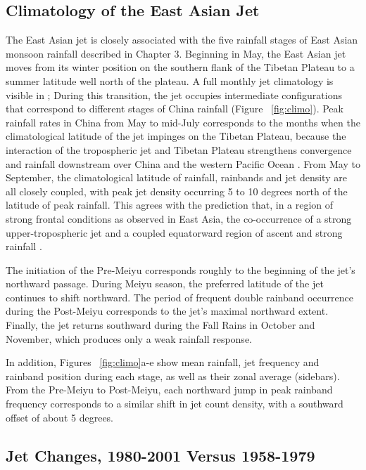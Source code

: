 \subsection{Climatology of the East Asian Jet}

	The East Asian jet is closely associated with the five rainfall stages of East Asian monsoon rainfall described in Chapter 3. Beginning in May, the East Asian jet moves from its winter position on the southern flank of the Tibetan Plateau to a summer latitude well north of the plateau.  A full monthly jet climatology is visible in \citet{Schiemann2009}; During this transition, the jet occupies intermediate configurations that correspond to different stages of China rainfall (Figure ~\ref{fig:climo}). Peak rainfall rates in China from May to mid-July corresponds to the months when the climatological latitude of the jet impinges on the Tibetan Plateau, because the interaction of the tropospheric jet and Tibetan Plateau strengthens convergence and rainfall downstream over China and the western Pacific Ocean \citep{Molnar2010,Sampe2010,Chen2014}. From May to September,  the climatological latitude of rainfall, rainbands and jet density are all closely coupled, with peak jet density occurring 5 to 10 degrees north of the latitude of peak rainfall. This agrees with the prediction that, in a region of strong frontal conditions as observed in East Asia, the co-occurrence of a strong upper-tropospheric jet and a coupled equatorward region of ascent and strong rainfall \citep{Holton2004}. 
	
	The initiation of the Pre-Meiyu corresponds roughly to the beginning of the jet's northward passage. During Meiyu season, the preferred latitude of the jet continues to shift northward. The period of frequent double rainband occurrence during the Post-Meiyu corresponds to the jet's maximal northward extent. Finally, the jet returns southward during the Fall Rains in October and November, which produces only a weak rainfall response.
	
	In addition, Figures ~\ref{fig:climo}a-e show mean rainfall, jet frequency and rainband position during each stage, as well as their zonal average (sidebars). From the Pre-Meiyu to Post-Meiyu, each northward jump in peak rainband frequency corresponds to a similar shift in jet count density, with a southward offset of about 5 degrees.
	
\subsection{Jet Changes, 1980-2001 Versus 1958-1979}

